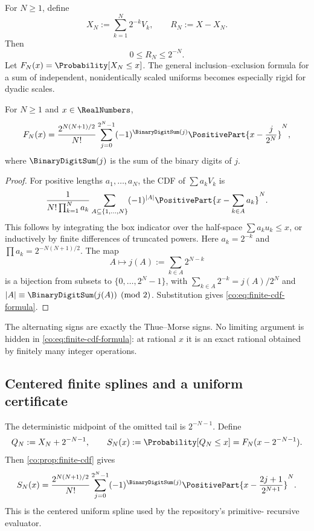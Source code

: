 For $N\ge1$, define
\begin{equation}\label{co:eq:finite-random-sum}
 X_N:=\sum_{k=1}^{N}2^{-k}V_k,
 \qquad
 R_N:=X-X_N.
\end{equation}
Then
\begin{equation}\label{co:eq:tail-bound}
 0\le R_N\le2^{-N}.
\end{equation}
Let $F_N(x)=\Probability[X_N\le x]$.  The general inclusion--exclusion formula for a
sum of independent, nonidentically scaled uniforms becomes especially rigid
for dyadic scales.

\begin{proposition}\label{co:prop:finite-cdf}
For $N\ge1$ and $x\in\RealNumbers$,
\begin{equation}\label{co:eq:finite-cdf-formula}
 F_N(x)=
 \frac{2^{N(N+1)/2}}{N!}
 \sum_{j=0}^{2^N-1}(-1)^{\BinaryDigitSum(j)}
 \PositivePart{x-\frac{j}{2^N}}^{N},
\end{equation}
where $\BinaryDigitSum(j)$ is the sum of the binary digits of $j$.
\end{proposition}

\begin{proof}
For positive lengths $a_1,\ldots,a_N$, the CDF of
$\sum a_kV_k$ is
\[
 \frac{1}{N!\prod_{k=1}^N a_k}
 \sum_{A\subseteq\{1,\ldots,N\}}(-1)^{|A|}
 \PositivePart{x-\sum_{k\in A}a_k}^{N}.
\]
This follows by integrating the box indicator over the half-space
$\sum a_ku_k\le x$, or inductively by finite differences of truncated powers.
Here $a_k=2^{-k}$ and
$\prod a_k=2^{-N(N+1)/2}$.  The map
\[
 A\longmapsto j(A):=\sum_{k\in A}2^{N-k}
\]
is a bijection from subsets to $\{0,\ldots,2^N-1\}$, with
$\sum_{k\in A}2^{-k}=j(A)/2^N$ and
$|A|\equiv \BinaryDigitSum(j(A))\pmod2$.  Substitution gives
\eqref{co:eq:finite-cdf-formula}.
\end{proof}

The alternating signs are exactly the Thue--Morse signs.  No limiting
argument is hidden in \eqref{co:eq:finite-cdf-formula}: at rational $x$ it is an
exact rational obtained by finitely many integer operations.

\subsection{Centered finite splines and a uniform certificate}

The deterministic midpoint of the omitted tail is $2^{-N-1}$.  Define
\begin{equation}\label{co:eq:centered-truncation}
 Q_N:=X_N+2^{-N-1},
 \qquad
 S_N(x):=\Probability[Q_N\le x]=F_N(x-2^{-N-1}).
\end{equation}
Then \cref{co:prop:finite-cdf} gives
\begin{equation}\label{co:eq:centered-spline-formula}
 S_N(x)=
 \frac{2^{N(N+1)/2}}{N!}
 \sum_{j=0}^{2^N-1}(-1)^{\BinaryDigitSum(j)}
 \PositivePart{x-\frac{2j+1}{2^{N+1}}}^{N}.
\end{equation}
This is the centered uniform spline used by the repository's primitive-
recursive evaluator.

